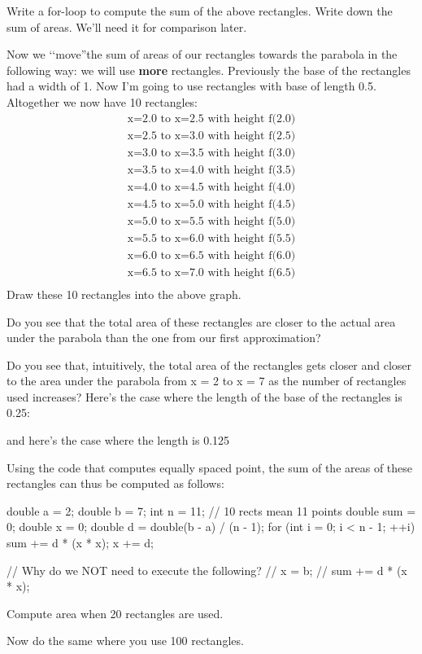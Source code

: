 \begin{ex}
Write a for-loop to compute the sum of the above
rectangles. Write down the sum of areas. We'll need it
for comparison later.
\end{ex}
Now we \lq\lq move''the sum of areas of our rectangles towards the parabola
in the following way: we will use \textbf{more} rectangles. Previously the
base of the rectangles had a width of 1. Now I'm going
to use rectangles with base of length 0.5. Altogether we now have 10
rectangles:
\begin{align*}
\text{x=2.0 to x=2.5 with height f(2.0)}\\
\text{x=2.5 to x=3.0 with height f(2.5)}\\
\text{x=3.0 to x=3.5 with height f(3.0)}\\
\text{x=3.5 to x=4.0 with height f(3.5)}\\
\text{x=4.0 to x=4.5 with height f(4.0)}\\
\text{x=4.5 to x=5.0 with height f(4.5)}\\
\text{x=5.0 to x=5.5 with height f(5.0)}\\
\text{x=5.5 to x=6.0 with height f(5.5)}\\
\text{x=6.0 to x=6.5 with height f(6.0)}\\
\text{x=6.5 to x=7.0 with height f(6.5)}\\
\end{align*}
Draw these 10 rectangles into the above graph.


Do you see that the total area of these rectangles are closer to the
actual area under the parabola than the one from our first
approximation?

Do you see that, intuitively, the total area of the rectangles gets
closer and closer to the area under the parabola from x = 2 to x = 7 as
the number of rectangles used increases? Here's the case
where the length of the base of the rectangles is 0.25:

and here's the case where the length is 0.125


Using the code that computes equally spaced point, the sum of the areas
of these rectangles can thus be computed as follows:
\begin{console}
double a = 2;
double b = 7;
int n = 11; // 10 rects mean 11 points
double sum = 0;
double x = 0;
double d = double(b - a) / (n - 1);
for (int i = 0; i < n - 1; ++i)
{   
    sum += d * (x * x);
    x += d;
}

// Why do we NOT need to execute the following?
// x = b;
// sum += d * (x * x);
\end{console}
\begin{ex}
Compute area when 20 rectangles are used.
\end{ex}
\begin{ex}
Now do the same where you use 100 rectangles.
\end{ex}


